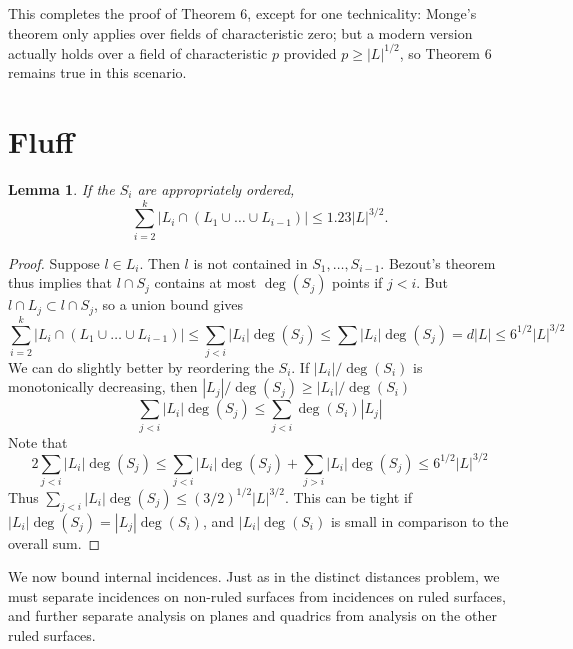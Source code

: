 \documentclass{article}
\theoremstyle{plain}
\newtheorem{lemma}[theorem]{Lemma}
\newtheorem*{example}{Example}
\DeclareMathOperator{\PP}{\mathbf{P}}
\begin{document}
This completes the proof of Theorem 6, except for one technicality: Monge's theorem only applies over fields of characteristic zero; but a modern version actually holds over a field of characteristic $p$ provided $p \geq |L|^{1/2}$, so Theorem 6 remains true in this scenario.


\section{Fluff}

\begin{lemma}
    If the $S_i$ are appropriately ordered,
    \[ \sum_{i = 2}^k |L_i \cap (L_1 \cup \dots \cup L_{i-1})| \leq 1.23 |L|^{3/2}. \]
\end{lemma}
\begin{proof}
    Suppose $l \in L_i$. Then $l$ is not contained in $S_1, \dots, S_{i-1}$. Bezout's theorem thus implies that $l \cap S_j$ contains at most $\deg(S_j)$ points if $j < i$. But $l \cap L_j \subset l \cap S_j$, so a union bound gives
    \[ \sum_{i = 2}^k |L_i \cap (L_1 \cup \dots \cup L_{i-1})| \leq \sum_{j < i} |L_i| \deg(S_j) \leq \sum |L_i| \deg(S_j) = d|L| \leq 6^{1/2} |L|^{3/2} \]
    We can do slightly better by reordering the $S_i$. If $|L_i|/\deg(S_i)$ is monotonically decreasing, then $|L_j|/\deg(S_j) \geq |L_i|/\deg(S_i)$
    \[ \sum_{j < i} |L_i| \deg(S_j) \leq \sum_{j < i} \deg(S_i) |L_j| \]
    Note that
    \[ 2 \sum_{j < i} |L_i| \deg(S_j) \leq \sum_{j < i} |L_i| \deg(S_j) + \sum_{j > i} |L_i| \deg(S_j) \leq 6^{1/2} |L|^{3/2} \]
    Thus $\sum_{j < i} |L_i| \deg(S_j) \leq (3/2)^{1/2} |L|^{3/2}$. This can be tight if $|L_i|\deg(S_j) = |L_j| \deg(S_i)$, and $|L_i|\deg(S_i)$ is small in comparison to the overall sum.
\end{proof}

We now bound internal incidences. Just as in the distinct distances problem, we must separate incidences on non-ruled surfaces from incidences on ruled surfaces, and further separate analysis on planes and quadrics from analysis on the other ruled surfaces.
\end{document}
